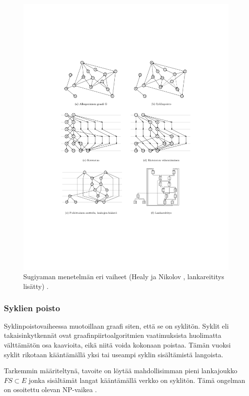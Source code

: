 \documentclass[finnish,12pt]{article}
\begin{document}
\newpage
\begin{figure}[!p]
\centering
\includegraphics[width=\textwidth]{hier.pdf}
\caption{Sugiyaman menetelmän eri vaiheet (Healy ja Nikolov \cite{RefWorks:70}, lankareititys lisätty) . }
\end{figure}

		\subsubsection{Syklien poisto}

Syklinpoistovaiheessa muotoillaan graafi siten, että se on syklitön.
Syklit eli takaisinkytkennät ovat graafinpiirtoalgoritmien vaatimuksista huolimatta välttämätön osa kaavioita, eikä niitä voida kokonaan poistaa.
Tämän vuoksi syklit rikotaan kääntämällä yksi tai useampi syklin sisältämistä langoista.

Tarkemmin määriteltynä, tavoite on löytää mahdollisimman pieni lankajoukko $FS \subset E $ jonka sisältämät langat kääntämällä verkko on syklitön.
Tämä ongelman on osoitettu olevan NP-vaikea \cite{RefWorks:65}. 
\end{document}
